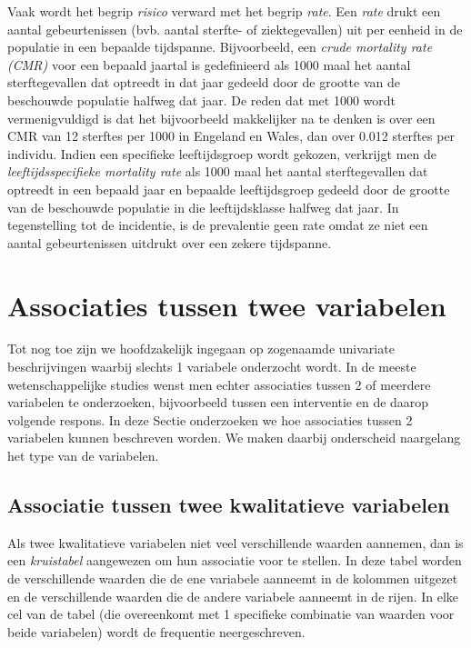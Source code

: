 \documentclass[
  12pt,dutch,coursenotes]{book}
\theoremstyle{definition}
\theoremstyle{definition}
\theoremstyle{definition}
\theoremstyle{definition}
\theoremstyle{remark}
\begin{document}
Vaak wordt het begrip \emph{risico} verward met het begrip \emph{rate}. Een
\emph{rate} drukt een aantal gebeurtenissen (bvb. aantal sterfte- of
ziektegevallen) uit per eenheid in de populatie in een bepaalde tijdspanne.
Bijvoorbeeld, een \emph{crude mortality rate (CMR)} voor een bepaald
jaartal is gedefinieerd als 1000 maal het aantal sterftegevallen dat
optreedt in dat jaar gedeeld door de grootte van de beschouwde populatie
halfweg dat jaar. De reden dat met 1000 wordt vermenigvuldigd is dat het
bijvoorbeeld makkelijker na te denken is over een CMR van 12 sterftes per
1000 in Engeland en Wales, dan over 0.012 sterftes per individu. Indien een
specifieke leeftijdsgroep wordt gekozen, verkrijgt men de \emph{leeftijdsspecifieke mortality rate} als 1000 maal het aantal sterftegevallen
dat optreedt in een bepaald jaar en bepaalde leeftijdsgroep gedeeld door de
grootte van de beschouwde populatie in die leeftijdsklasse halfweg dat jaar.
In tegenstelling tot de incidentie, is de prevalentie geen rate omdat ze
niet een aantal gebeurtenissen uitdrukt over een zekere tijdspanne.

\hypertarget{associaties-tussen-twee-variabelen}{%
\section{Associaties tussen twee variabelen}\label{associaties-tussen-twee-variabelen}}

Tot nog toe zijn we hoofdzakelijk ingegaan op zogenaamde univariate beschrijvingen waarbij slechts 1 variabele onderzocht wordt. In de meeste wetenschappelijke studies wenst men echter associaties tussen 2 of meerdere variabelen te onderzoeken, bijvoorbeeld tussen een interventie en de daarop volgende respons. In deze Sectie onderzoeken we hoe associaties tussen 2 variabelen kunnen beschreven worden. We maken daarbij onderscheid naargelang het type van de variabelen.

\hypertarget{subsec:kruistabel}{%
\subsection{Associatie tussen twee kwalitatieve variabelen}\label{subsec:kruistabel}}

Als twee kwalitatieve variabelen niet veel verschillende waarden aannemen,
dan is een \emph{kruistabel} aangewezen om hun associatie voor te stellen.
In deze tabel worden de verschillende waarden die de ene variabele aanneemt
in de kolommen uitgezet en de verschillende waarden die de andere variabele
aanneemt in de rijen. In elke cel van de tabel (die overeenkomt met 1
specifieke combinatie van waarden voor beide variabelen) wordt de frequentie
neergeschreven.
\end{document}
